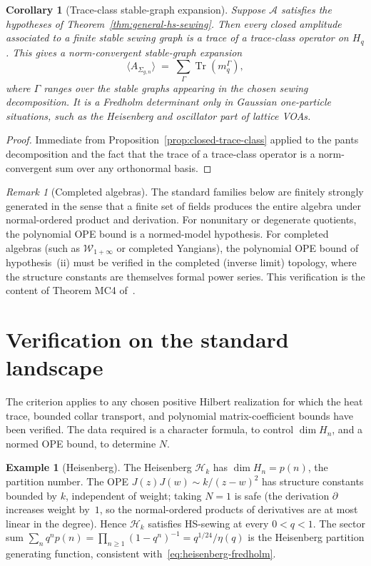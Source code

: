 \documentclass[11pt,reqno]{amsart}
\newtheorem{corollary}[theorem]{Corollary}
\theoremstyle{definition}
\newtheorem{example}[theorem]{Example}
\theoremstyle{remark}
\newtheorem{remark}[theorem]{Remark}
\newcommand{\cA}{\mathcal{A}}
\newcommand{\cH}{\mathcal{H}}
\newcommand{\cW}{\mathcal{W}}
\numberwithin{equation}{section}
\begin{document}
\begin{corollary}[Trace-class stable-graph expansion]
\label{cor:trace-class-stable-graph}
Suppose $\cA$ satisfies the hypotheses of
Theorem~\ref{thm:general-hs-sewing}. Then every closed amplitude
associated to a finite stable sewing graph is a trace of a
trace-class operator on $H_q$. This gives a norm-convergent
stable-graph expansion
\[
\langle A_{\Sigma_{g,n}}\rangle
\;=\;
\sum_{\Gamma}
\operatorname{Tr}(m_q^{\Gamma}),
\]
where $\Gamma$ ranges over the stable graphs appearing in the
chosen sewing decomposition. It is a Fredholm determinant only in
Gaussian one-particle situations, such as the Heisenberg and
oscillator part of lattice VOAs.
\end{corollary}

\begin{proof}
Immediate from Proposition~\ref{prop:closed-trace-class} applied
to the pants decomposition and the fact that the trace of a
trace-class operator is a norm-convergent sum over any
orthonormal basis.
\end{proof}

\begin{remark}[Completed algebras]\label{rem:completed}
The standard families below are finitely strongly generated in the
sense that a finite set of fields produces the entire algebra under
normal-ordered product and derivation. For nonunitary or degenerate
quotients, the polynomial OPE bound is a normed-model hypothesis. For
completed algebras (such as $\cW_{1+\infty}$ or completed
Yangians), the polynomial OPE bound of
hypothesis~(ii) must be verified in the completed (inverse
limit) topology, where the structure constants are themselves
formal power series. This verification is the content of
Theorem MC4 of~\cite{LorgatVolI}.
\end{remark}

\section{Verification on the standard landscape}\label{sec:examples}

The criterion applies to any chosen positive Hilbert realization for
which the heat trace, bounded collar transport, and polynomial
matrix-coefficient bounds have been verified. The data required is
a character formula, to control $\dim H_n$, and a normed OPE bound,
to determine $N$.

\begin{example}[Heisenberg]\label{ex:heisenberg}
The Heisenberg $\cH_k$ has $\dim H_n = p(n)$, the partition
number. The OPE
$J(z)J(w) \sim k/(z-w)^2$ has structure constants bounded by
$k$, independent of weight; taking $N = 1$ is safe (the
derivation $\partial$ increases weight by~$1$, so the
normal-ordered products of derivatives are at most linear in
the degree). Hence $\cH_k$ satisfies HS-sewing at every
$0 < q < 1$. The sector sum
$\sum_n q^n p(n) = \prod_{n \geq 1}(1-q^n)^{-1} = q^{1/24}/\eta(q)$
is the Heisenberg partition generating function,
consistent with~\eqref{eq:heisenberg-fredholm}.
\end{example}
\end{document}
